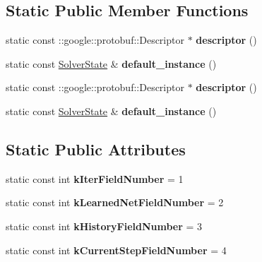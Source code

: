 \subsection*{Static Public Member Functions}
\begin{DoxyCompactItemize}
\item 
\mbox{\label{classcaffe_1_1_solver_state_aa95883e467d5691629128d1f1d0da5e1}} 
static const \+::google\+::protobuf\+::\+Descriptor $\ast$ {\bfseries descriptor} ()
\item 
\mbox{\label{classcaffe_1_1_solver_state_a26138bdf274b8c8aabf19c22423ecfbf}} 
static const \mbox{\hyperlink{classcaffe_1_1_solver_state}{Solver\+State}} \& {\bfseries default\+\_\+instance} ()
\item 
\mbox{\label{classcaffe_1_1_solver_state_a732edfd1e7dc069a9925331cfd14fe98}} 
static const \+::google\+::protobuf\+::\+Descriptor $\ast$ {\bfseries descriptor} ()
\item 
\mbox{\label{classcaffe_1_1_solver_state_abf2aa231d374732fbb013a85ade0a041}} 
static const \mbox{\hyperlink{classcaffe_1_1_solver_state}{Solver\+State}} \& {\bfseries default\+\_\+instance} ()
\end{DoxyCompactItemize}
\subsection*{Static Public Attributes}
\begin{DoxyCompactItemize}
\item 
\mbox{\label{classcaffe_1_1_solver_state_aeb8be6c94f4b23e5471c72f33353ca90}} 
static const int {\bfseries k\+Iter\+Field\+Number} = 1
\item 
\mbox{\label{classcaffe_1_1_solver_state_a78076f587af0bac0a9cdf59213320119}} 
static const int {\bfseries k\+Learned\+Net\+Field\+Number} = 2
\item 
\mbox{\label{classcaffe_1_1_solver_state_a14cc7b9cfcb1db0327894499eada1212}} 
static const int {\bfseries k\+History\+Field\+Number} = 3
\item 
\mbox{\label{classcaffe_1_1_solver_state_a169f4ac19f5fdca5a493fe78efaeecaf}} 
static const int {\bfseries k\+Current\+Step\+Field\+Number} = 4
\end{DoxyCompactItemize}

